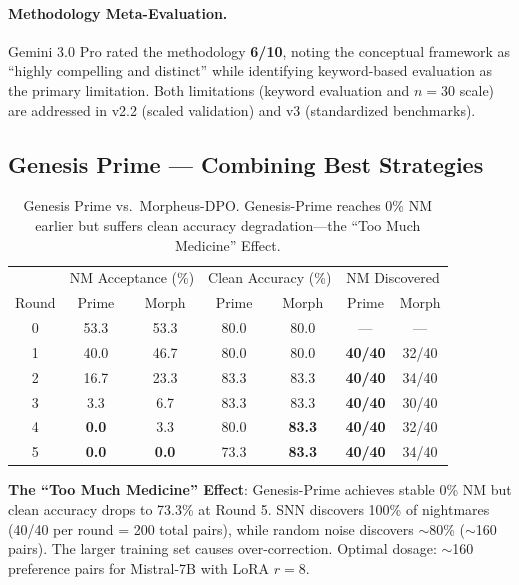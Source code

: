 \documentclass[11pt,a4paper]{article}
\begin{document}
\paragraph{Methodology Meta-Evaluation.} Gemini 3.0 Pro \cite{zheng2023judging} rated the methodology \textbf{6/10}, noting the conceptual framework as ``highly compelling and distinct'' while identifying keyword-based evaluation as the primary limitation. Both limitations (keyword evaluation and $n=30$ scale) are addressed in v2.2 (scaled validation) and v3 (standardized benchmarks).

\subsection{Genesis Prime --- Combining Best Strategies}

\begin{table}[h]
\centering
\small
\begin{tabular}{c|cc|cc|cc}
\toprule
& \multicolumn{2}{c|}{NM Acceptance (\%)} & \multicolumn{2}{c|}{Clean Accuracy (\%)} & \multicolumn{2}{c}{NM Discovered} \\
Round & Prime & Morph & Prime & Morph & Prime & Morph \\
\midrule
0 & 53.3 & 53.3 & 80.0 & 80.0 & --- & --- \\
1 & 40.0 & 46.7 & 80.0 & 80.0 & \textbf{40/40} & 32/40 \\
2 & 16.7 & 23.3 & 83.3 & 83.3 & \textbf{40/40} & 34/40 \\
3 & 3.3 & 6.7 & 83.3 & 83.3 & \textbf{40/40} & 30/40 \\
4 & \textbf{0.0} & 3.3 & 80.0 & \textbf{83.3} & \textbf{40/40} & 32/40 \\
5 & \textbf{0.0} & \textbf{0.0} & \colorbox{yellow!30}{73.3} & \textbf{83.3} & \textbf{40/40} & 34/40 \\
\bottomrule
\end{tabular}
\caption{Genesis Prime vs.\ Morpheus-DPO. Genesis-Prime reaches 0\% NM earlier but suffers clean accuracy degradation---the ``Too Much Medicine'' Effect.}
\label{tab:genesis_prime}
\end{table}

\textbf{The ``Too Much Medicine'' Effect}: Genesis-Prime achieves stable 0\% NM but clean accuracy drops to 73.3\% at Round 5. SNN discovers 100\% of nightmares (40/40 per round = 200 total pairs), while random noise discovers $\sim$80\% ($\sim$160 pairs). The larger training set causes over-correction. Optimal dosage: $\sim$160 preference pairs for Mistral-7B with LoRA $r=8$.
\end{document}
